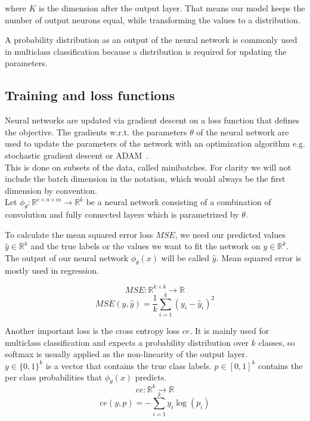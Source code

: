 \documentclass{article}
\begin{document}
where $K$ is the dimension after the output layer. That means our model keeps the number of output
neurons equal, while transforming the values to a distribution.

\noindent A probability distribution as an output of the neural network is commonly used in multiclass classification
because a distribution is required for updating the parameters.

\subsection{Training and loss functions}
\noindent Neural networks are updated via gradient descent on a loss function that defines the objective.
The gradients w.r.t. the parameters $\theta$ of the neural network are used to update the parameters of the network
with an optimization algorithm e.g. stochastic gradient descent or ADAM~\cite{journals/corr/KingmaB14}. \\
This is done on subsets of the data, called minibatches.
For clarity we will not include the batch dimension in the notation, which would always be the first dimension
by convention.\\

\noindent Let $\phi_\theta: \mathbb{R}^{c \times n \times m} \xrightarrow{} \mathbb{R}^{k}$ be a neural network
consisting of a combination of convolution and fully connected layers which is parametrized by $\theta$.

\noindent To calculate the mean squared error loss $MSE$, 
we need our predicted values $\hat y \in \mathbb{R}^{k}$ and the true
labels or the values we want to fit the network on $y \in \mathbb{R}^{k}$.
The output of our neural network $\phi_\theta(x)$ will be called $\hat{y}$. 
Mean squared error is mostly used in regression.

\begin{equation}
    MSE: \mathbb{R}^{k \times k} \xrightarrow{} \mathbb{R}
\end{equation}
\begin{equation*}
    MSE(y, \hat{y}) = \frac{1}{k} \sum_{i=1}^{k} (y_i-\hat{y}_i)^2
\end{equation*}

\noindent Another important loss is the cross entropy loss $ce$. It is mainly used for multiclass classification 
and expects a probability distribution over $k$ classes, so softmax is usually applied as the 
non-linearity of the output layer.\\
$y \in \{0, 1\}^{k}$ is  a vector that contains the true class labels. $p \in [0, 1]^{k}$ contains
the per class probabilities that $\phi_\theta(x)$ predicts.
\begin{equation}
    ce: \mathbb{R}^{k} \xrightarrow{} \mathbb{R}
\end{equation}
\begin{equation*}
    ce(y, p) = -\sum_{i=1}^k y_{i}\log(p_{i})
\end{equation*}
\end{document}
